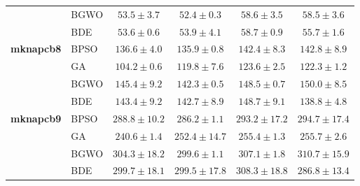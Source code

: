 \begin{table}[htbp]
\begin{tabular*}{\textwidth}{@{\extracolsep{\fill}}llcccc@{}}
                       & BGWO  &           $53.5 \pm 3.7$ &  $\mathbf{52.4 \pm 0.3}$ &           $58.6 \pm 3.5$ &           $58.5 \pm 3.6$ \\
                       & BDE   &  $\mathbf{53.6 \pm 0.6}$ &           $53.9 \pm 4.1$ &           $58.7 \pm 0.9$ &           $55.7 \pm 1.6$ \\
    \midrule
    \textbf{mknapcb8}  & BPSO  &          $136.6 \pm 4.0$ & $\mathbf{135.9 \pm 0.8}$ &          $142.4 \pm 8.3$ &          $142.8 \pm 8.9$ \\
                       & GA    & $\mathbf{104.2 \pm 0.6}$ &          $119.8 \pm 7.6$ &          $123.6 \pm 2.5$ &          $122.3 \pm 1.2$ \\
                       & BGWO  &          $145.4 \pm 9.2$ & $\mathbf{142.3 \pm 0.5}$ &          $148.5 \pm 0.7$ &          $150.0 \pm 8.5$ \\
                       & BDE   &          $143.4 \pm 9.2$ &          $142.7 \pm 8.9$ &          $148.7 \pm 9.1$ & $\mathbf{138.8 \pm 4.8}$ \\
    \midrule
    \textbf{mknapcb9}  & BPSO  &         $288.8 \pm 10.2$ & $\mathbf{286.2 \pm 1.1}$ &         $293.2 \pm 17.2$ &         $294.7 \pm 17.4$ \\
                       & GA    & $\mathbf{240.6 \pm 1.4}$ &         $252.4 \pm 14.7$ &          $255.4 \pm 1.3$ &          $255.7 \pm 2.6$ \\
                       & BGWO  &         $304.3 \pm 18.2$ & $\mathbf{299.6 \pm 1.1}$ &          $307.1 \pm 1.8$ &         $310.7 \pm 15.9$ \\
                       & BDE   &         $299.7 \pm 18.1$ &         $299.5 \pm 17.8$ &         $308.3 \pm 18.8$ & $\mathbf{286.8 \pm 13.4}$ \\
    \bottomrule
  \end{tabular*}
\end{table}
